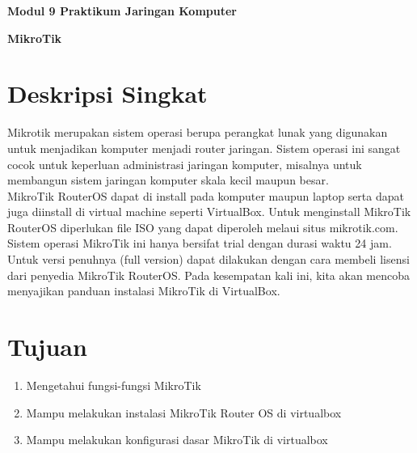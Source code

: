 \documentclass{article}
\begin{document}
    \begin{center}
        \textbf{Modul 9 Praktikum Jaringan Komputer}

        \textbf{MikroTik}
    \end{center}

    \section*{Deskripsi Singkat}
    \hspace{\parindent} Mikrotik merupakan sistem operasi berupa perangkat lunak yang 
    digunakan untuk menjadikan komputer menjadi router jaringan. 
    Sistem operasi ini sangat cocok untuk keperluan administrasi 
    jaringan komputer, misalnya untuk membangun sistem jaringan komputer 
    skala kecil maupun besar.\\

    MikroTik RouterOS dapat di install pada komputer maupun laptop serta 
    dapat juga diinstall di virtual machine seperti VirtualBox. 
    Untuk menginstall MikroTik RouterOS diperlukan file ISO yang dapat diperoleh 
    melaui situs mikrotik.com. Sistem operasi MikroTik ini hanya bersifat 
    trial dengan durasi waktu 24 jam. Untuk versi penuhnya (full version) 
    dapat dilakukan dengan cara membeli lisensi dari penyedia MikroTik RouterOS. 
    Pada kesempatan kali ini, kita akan mencoba menyajikan panduan instalasi 
    MikroTik di VirtualBox.


    \section*{Tujuan}
    \begin{enumerate}
        \item Mengetahui fungsi-fungsi MikroTik 
        \item Mampu melakukan instalasi MikroTik Router OS di virtualbox 
        \item Mampu melakukan konfigurasi dasar MikroTik di virtualbox
        \newline 
    \end{enumerate}


\end{document}
